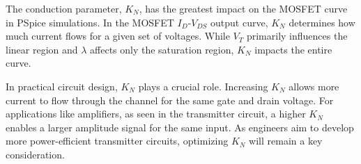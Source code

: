 \documentclass[12pt]{article}
\begin{document}
The conduction parameter, \( K_N \), has the greatest impact on the MOSFET curve in PSpice simulations. In the MOSFET \( I_D \)-\( V_{DS} \) output curve, \( K_N \) determines how much current flows for a given set of voltages. While \( V_T \) primarily influences the linear region and \( \lambda \) affects only the saturation region, \( K_N \) impacts the entire curve. 

In practical circuit design, \( K_N \) plays a crucial role. Increasing \( K_N \) allows more current to flow through the channel for the same gate and drain voltage. For applications like amplifiers, as seen in the transmitter circuit, a higher \( K_N \) enables a larger amplitude signal for the same input. As engineers aim to develop more power-efficient transmitter circuits, optimizing \( K_N \) will remain a key consideration.
\end{document}
